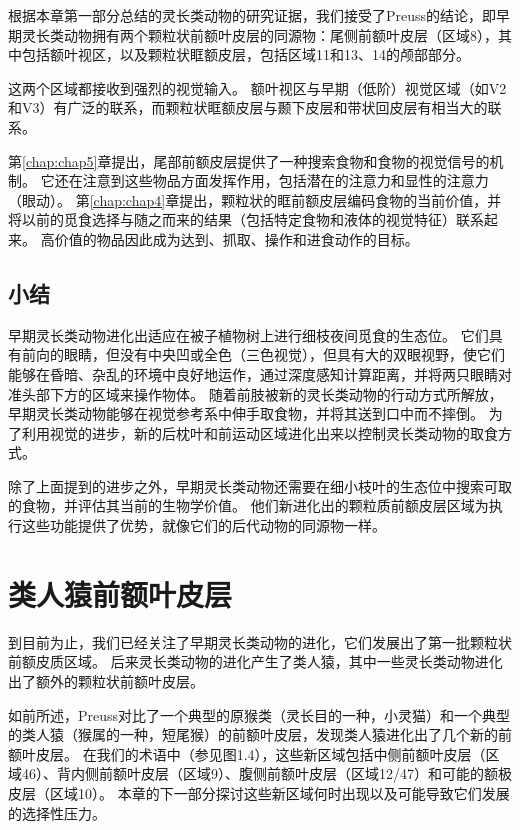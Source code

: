 根据本章第一部分总结的灵长类动物的研究证据，我们接受了Preuss的结论，即早期灵长类动物拥有两个颗粒状前额叶皮层的同源物：尾侧前额叶皮层（区域8），其中包括额叶视区，以及颗粒状眶额皮层，包括区域11和13、14的颅部部分。


这两个区域都接收到强烈的视觉输入。
额叶视区与早期（低阶）视觉区域（如V2和V3）有广泛的联系\cite{stanton1995topography}，而颗粒状眶额皮层与颞下皮层和带状回皮层有相当大的联系\cite{saleem2008complementary}。


第\ref{chap:chap5}章提出，尾部前额皮层提供了一种搜索食物和食物的视觉信号的机制。
它还在注意到这些物品方面发挥作用，包括潜在的注意力和显性的注意力（眼动）。
第\ref{chap:chap4}章提出，颗粒状的眶前额皮层编码食物的当前价值，并将以前的觅食选择与随之而来的结果（包括特定食物和液体的视觉特征）联系起来。
高价值的物品因此成为达到、抓取、操作和进食动作的目标。



\subsection{小结}

早期灵长类动物进化出适应在被子植物树上进行细枝夜间觅食的生态位。
它们具有前向的眼睛，但没有中央凹或全色（三色视觉），但具有大的双眼视野，使它们能够在昏暗、杂乱的环境中良好地运作，通过深度感知计算距离，并将两只眼睛对准头部下方的区域来操作物体。
随着前肢被新的灵长类动物的行动方式所解放，早期灵长类动物能够在视觉参考系中伸手取食物，并将其送到口中而不摔倒。
为了利用视觉的进步，新的后枕叶和前运动区域进化出来以控制灵长类动物的取食方式。


除了上面提到的进步之外，早期灵长类动物还需要在细小枝叶的生态位中搜索可取的食物，并评估其当前的生物学价值。
他们新进化出的颗粒质前额皮层区域为执行这些功能提供了优势，就像它们的后代动物的同源物一样。



\section{类人猿前额叶皮层}

到目前为止，我们已经关注了早期灵长类动物的进化，它们发展出了第一批颗粒状前额皮质区域。
后来灵长类动物的进化产生了类人猿，其中一些灵长类动物进化出了额外的颗粒状前额叶皮层。


如前所述，Preuss\cite{preuss1991myelo}对比了一个典型的原猴类（灵长目的一种，小灵猫）和一个典型的类人猿（猴属的一种，短尾猴）的前额叶皮层，发现类人猿进化出了几个新的前额叶皮层。
在我们的术语中（参见图1.4），这些新区域包括中侧前额叶皮层（区域46）、背内侧前额叶皮层（区域9）、腹侧前额叶皮层（区域12/47）和可能的额极皮层（区域10）。
本章的下一部分探讨这些新区域何时出现以及可能导致它们发展的选择性压力。


